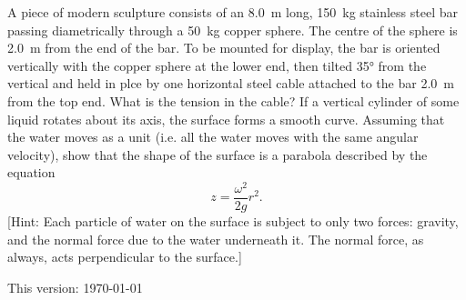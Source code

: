 \documentclass[a4paper]{exam}
\begin{document}
\begin{questions}
    \question A piece of modern sculpture consists of an \SI{8.0}{\metre} long, \SI{150}{\kilo\gram} stainless steel bar passing diametrically through
              a \SI{50}{\kilo\gram} copper sphere. The centre of the sphere is \SI{2.0}{\metre} from the end of the bar. To be mounted for display, the
              bar is oriented vertically with the copper sphere at the lower end, then tilted \ang{35} from the vertical and held in plce by one horizontal
              steel cable attached to the bar \SI{2.0}{\metre} from the top end. What is the tension in the cable?
    \question {[Difficult]} If a vertical cylinder of some liquid rotates about its axis, the surface forms a smooth curve. Assuming that the water
              moves as a unit (i.e. all the water moves with the same angular velocity), show that the shape of the surface is a parabola described
              by the equation
              \begin{equation}
                z = \frac{\omega^2}{2g} r^2.
              \end{equation}
              [Hint: Each particle of water on the surface is subject to only two forces: gravity, and the normal force due to the water underneath
              it. The normal force, as always, acts perpendicular to the surface.]
  \end{questions}

\vspace*{\fill}
This version: \today
\end{document}
